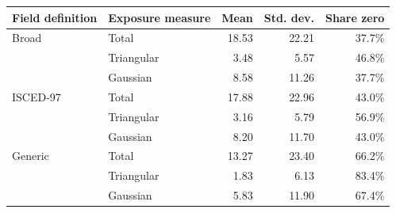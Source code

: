 \begin{tabular}{llrrr}
\toprule
Field definition & Exposure measure & Mean & Std. dev. & Share zero \\
\midrule
Broad & Total & 18.53 & 22.21 & 37.7\% \\
 & Triangular &  3.48 &  5.57 & 46.8\% \\
 & Gaussian &  8.58 & 11.26 & 37.7\% \\
\addlinespace[0.05cm]
ISCED-97 & Total & 17.88 & 22.96 & 43.0\% \\
 & Triangular &  3.16 &  5.79 & 56.9\% \\
 & Gaussian &  8.20 & 11.70 & 43.0\% \\
\addlinespace[0.05cm]
Generic & Total & 13.27 & 23.40 & 66.2\% \\
 & Triangular &  1.83 &  6.13 & 83.4\% \\
 & Gaussian &  5.83 & 11.90 & 67.4\% \\
\bottomrule
\end{tabular}
